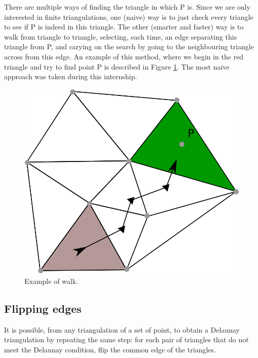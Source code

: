 \documentclass[a4paper,10pt]{article}
\begin{document}
There are multiple ways of finding the triangle in which P is. Since we are only interested in finite triangulations, one (naive) way is to just check every triangle to see if P is indeed in this triangle. The other (smarter and faster) way is to walk from triangle to triangle, selecting, each time, an edge separating this triangle from P, and carying on the search by going to the neighbouring triangle across from this edge. An example of this method, where we begin in the red triangle and try to find point P is described in Figure \ref{walk}.
The most naive approach was taken during this internship.

\begin{figure}
  \centering
\includegraphics[scale=1]{Walk}
  \caption{\label{walk} Example of walk.}
\end{figure}


\subsection{Flipping edges}

It is possible, from any triangulation of a set of point, to obtain a Delaunay triangulation by repeating the same step: for each pair of triangles that do not meet the Delaunay condition, flip the common edge of the triangles.
\end{document}
